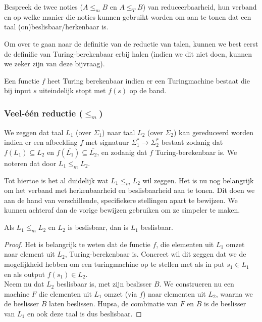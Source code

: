 \begin{quest}[Reduceerbaarheid]
	Bespreek de twee noties ($A \leq_m B$ en $A \leq_T B$) van reduceerbaarheid, hun verband en op welke manier die noties kunnen gebruikt worden om aan te tonen dat een taal (on)beslisbaar/herkenbaar is.
\end{quest}

Om over te gaan naar de definitie van de reductie van talen, kunnen we best eerst de definifie van Turing-berekenbaar erbij halen (indien we dit niet doen, kunnen we zeker zijn van deze bijvraag).

\begin{theorem}
	Een functie $f$ heet Turing berekenbaar indien er een Turingmachine bestaat die bij input $s$ uiteindelijk stopt met $f(s)$ op de band.
\end{theorem}

\subsubsection*{Veel-\'e\'en reductie ($\leq_m$)}

\begin{theorem}
	We zeggen dat taal $L_1$ (over $\Sigma_1$) naar taal $L_2$ (over $\Sigma_2$) kan gereduceerd worden indien er een afbeelding $f$ met signatuur $\Sigma^*_1\longrightarrow \Sigma^*_2$ bestaat zodanig dat $f(L_1) \subseteq L_2$ en $f(\overline{L_1}) \subseteq \overline{L_2}$, en zodanig dat $f$ Turing-berekenbaar is. We noteren dat door $L_1 \leq_m L_2$.
\end{theorem}

Tot hiertoe is het al duidelijk wat $L_1 \leq_m L_2$ wil zeggen. Het is nu nog belangrijk om het verband met herkenbaarheid en beslisbaarheid aan te tonen. Dit doen we aan de hand van verschillende, specifiekere stellingen apart te bewijzen. We kunnen achteraf dan de vorige bewijzen gebruiken om ze simpeler te maken.

\begin{theorem}
	Als $L_1 \leq_m L_2$ en $L_2$ is beslisbaar, dan is $L_1$ beslisbaar.
\end{theorem}

\begin{proof}
	Het is belangrijk te weten dat de functie $f$, die elementen uit $L_1$ omzet naar element uit $L_2$, Turing-berekenbaar is. Concreet wil dit zeggen dat we de mogelijkheid hebben om een turingmachine op te stellen met als in put $s_1 \in L_1$ en als output $f(s_1) \in L_2$.\\
	Neem nu dat $L_2$ beslisbaar is, met zijn beslisser $B$. We construeren  nu een machine $F$ die elementen uit $L_1$ omzet (via $f$) naar elementen uit $L_2$, waarna we de beslisser $B$ laten beslissen. Hupsa, de combinatie van $F$ en $B$ is de beslisser van $L_1$ en ook deze taal is dus beslisbaar.
\end{proof}

